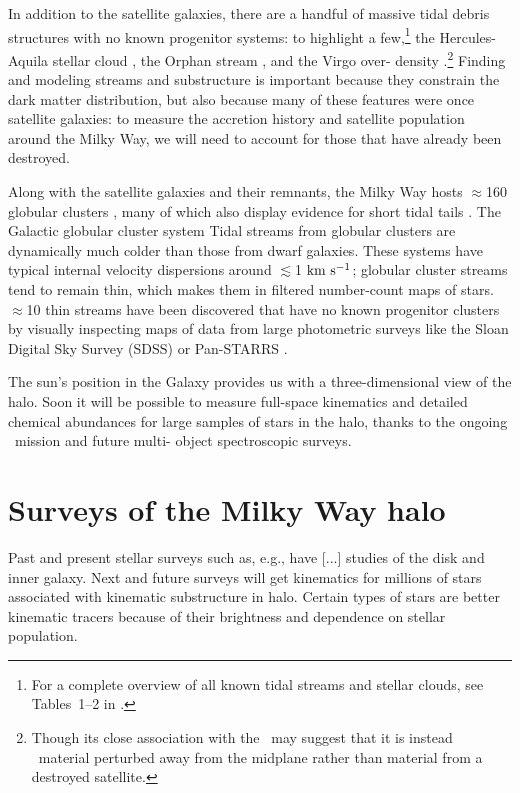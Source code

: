 In addition to the satellite galaxies, there are a handful of massive tidal
debris structures with no known progenitor systems: to highlight a
few,\footnote{For a complete overview of all known tidal streams and stellar
clouds, see Tables~1--2 in \cite{grillmair16}.} the Hercules-Aquila stellar
cloud \citep{belokurov07b}, the Orphan stream \citep{grillmair06b}, and the
Virgo over- density \citep{juric08}.\footnote{Though its close association with
the \mwdisk\ may suggest that it is instead \mwdisk\ material perturbed away
from the midplane rather than material from a destroyed satellite.} Finding and
modeling streams and substructure is important because they constrain the dark
matter distribution, but also because many of these features were once satellite
galaxies: to measure the accretion history and satellite population around the
Milky Way, we will need to account for those that have already been destroyed.

Along with the satellite galaxies and their remnants, the Milky Way hosts
$\approx$160 globular clusters \citep{harris10}, many of which also display
evidence for short tidal tails \citep{grillmair95, leon00}. The Galactic
globular cluster system  Tidal streams from globular clusters are
dynamically much colder than those from dwarf galaxies. These systems have
typical internal velocity dispersions around $\lesssim$1$~\mathrm{km}~\mathrm{s}^{-1}$; globular
cluster streams tend to remain thin, which makes them  in
filtered number-count maps of stars. $\approx$10 thin streams have been
discovered that have no known progenitor clusters by visually inspecting maps
of data from large photometric surveys like the Sloan Digital Sky Survey (SDSS)
or Pan-STARRS \citep[e.g.,][]{grillmair06a, bonaca12, bernard14}.

The sun's position in the Galaxy provides us with a three-dimensional view of
the halo. Soon it will be possible to measure full-space kinematics and detailed
chemical abundances for large samples of stars in the halo, thanks to the
ongoing \gaia\ mission and future multi- object spectroscopic surveys. 

\section{Surveys of the Milky Way halo} \label{sec:mw-surveys}

Past and present stellar surveys such as, e.g., have [...] studies of the disk
and inner galaxy. Next and future surveys will get kinematics for millions of
stars associated with kinematic substructure in halo. Certain types of stars are
better kinematic tracers because of their brightness and dependence on stellar
population.

